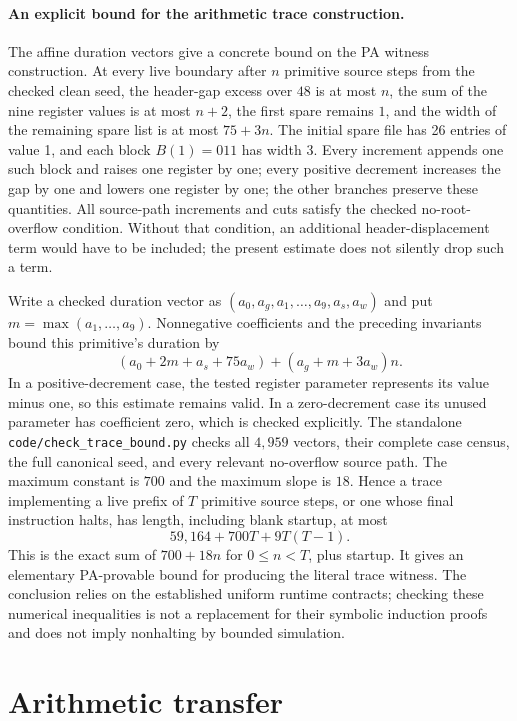 \documentclass[11pt]{article}
\newcommand{\file}[1]{\texttt{\nolinkurl{#1}}}
\begin{document}
\paragraph{An explicit bound for the arithmetic trace construction.}
The affine duration vectors give a concrete bound on the PA witness
construction.  At every live boundary after $n$ primitive source steps
from the checked clean seed, the header-gap excess over $48$ is at most
$n$, the sum of the nine
register values is at most $n+2$, the first spare remains $1$, and the
width of the remaining spare list is at most $75+3n$.  The initial spare
file has 26 entries of value 1, and each block $B(1)=011$ has width 3.
Every increment appends one such block and raises one register by one;
every positive decrement increases the gap by one and lowers one
register by one; the other branches preserve these quantities.
All source-path increments and cuts satisfy the checked no-root-overflow
condition.  Without that condition, an additional header-displacement
term would have to be included; the present estimate does not silently
drop such a term.

Write a checked duration vector as
$(a_0,a_g,a_1,\ldots,a_9,a_s,a_w)$ and put
$m=\max(a_1,\ldots,a_9)$.  Nonnegative coefficients and the preceding
invariants bound this primitive's duration by
\[
  (a_0+2m+a_s+75a_w)+(a_g+m+3a_w)n.
\]
In a positive-decrement case, the tested register parameter represents
its value minus one, so this estimate remains valid.  In a zero-decrement
case its unused parameter has coefficient zero, which is checked
explicitly.  The standalone \file{code/check_trace_bound.py} checks all
$4{,}959$ vectors, their complete case census, the full canonical seed,
and every relevant no-overflow source path.  The maximum constant is
$700$ and the maximum slope is $18$.  Hence a trace implementing a live
prefix of $T$ primitive source steps, or one whose final instruction
halts, has length, including blank startup, at most
\[
 \boxed{59{,}164+700T+9T(T-1)}.
\]
This is the exact sum of $700+18n$ for $0\leq n<T$, plus startup.
It gives an elementary PA-provable bound for producing the literal
trace witness.  The conclusion relies on the established uniform runtime
contracts; checking these numerical inequalities is not a replacement
for their symbolic induction proofs and does not imply nonhalting by
bounded simulation.

\section{Arithmetic transfer}
\end{document}
